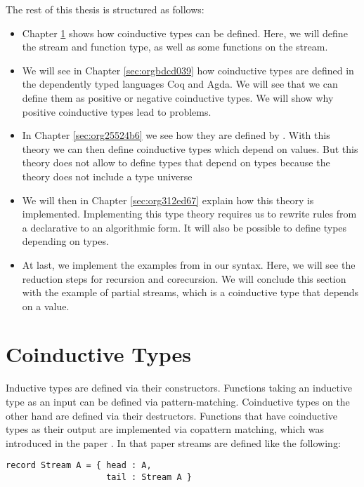 \documentclass[a4paper,cleardoubleempty,BCOR1cm]{scrbook}
\begin{document}
The rest of this thesis is structured as follows:

\begin{itemize}
\item Chapter \ref{sec:org5fdab5d} shows how coinductive types can be defined.
Here, we will define the stream and function type, as well as some
functions on the stream.

\item We will see in Chapter \ref{sec:orgbdcd039} how
coinductive types are defined in the dependently typed languages Coq and
Agda. We will see that we can define them as positive or negative
coinductive types. We will show why positive coinductive types lead to
problems.

\item In Chapter \ref{sec:org25524b6} we
see how they are defined by \cite{basold2016type}. With this theory we can
then define coinductive types which depend on values. But this theory does
not allow to define types that depend on types because the theory does not
include a type universe

\item We will then in Chapter \ref{sec:org312ed67} explain how this theory is
implemented. Implementing this type theory requires us to rewrite rules from
a declarative to an algorithmic form. It will also be possible to define
types depending on types.

\item At last, we implement the examples from \cite{basold2016type} in our syntax.
Here, we will see the reduction steps for recursion and corecursion. We will
conclude this section with the example of partial streams, which is a
coinductive type that depends on a value.
\end{itemize}

\chapter{Coinductive Types}
\label{sec:org5fdab5d}
Inductive types are defined via their constructors. Functions taking an
inductive type as an input can be defined via pattern-matching. Coinductive
types on the other hand are defined via their destructors. Functions that
have coinductive types as their output are implemented via copattern matching,
which was introduced in the paper \cite{abel2013copatterns}. In that paper
streams are defined like the following:

\begin{lstlisting}
record Stream A = { head : A,
                    tail : Stream A }
\end{lstlisting}
\end{document}
